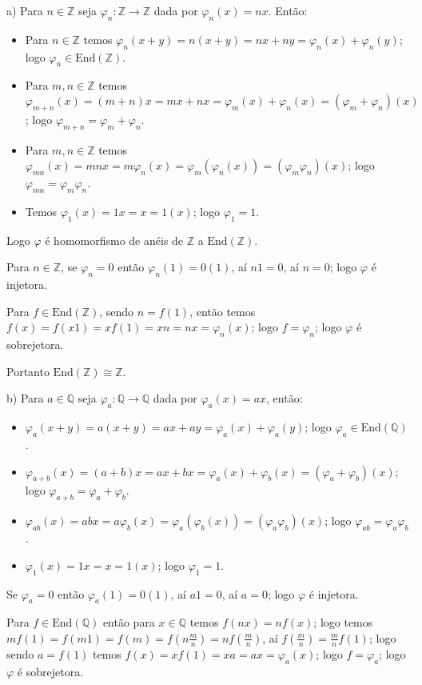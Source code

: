 \documentclass[10pt,a4paper]{article}
\begin{document}
a) Para $n\in\mathbb{Z}$ seja $\varphi_n:\mathbb{Z}\rightarrow\mathbb{Z}$ dada por $\varphi_n(x)=nx$. Então:
\begin{itemize}
\item Para $n\in\mathbb{Z}$ temos $\varphi_n(x+y)=n(x+y)=nx+ny=\varphi_n(x)+\varphi_n(y)$; logo $\varphi_n\in\mathrm{End}(\mathbb{Z})$.
\item Para $m,n\in\mathbb{Z}$ temos $\varphi_{m+n}(x)=(m+n)x=mx+nx=\varphi_m(x)+\varphi_n(x)=(\varphi_m+\varphi_n)(x)$; logo $\varphi_{m+n}=\varphi_m+\varphi_n$.
\item Para $m,n\in\mathbb{Z}$ temos $\varphi_{mn}(x)=mnx=m\varphi_n(x)=\varphi_m(\varphi_n(x))=(\varphi_m\varphi_n)(x)$; logo $\varphi_{mn}=\varphi_m\varphi_n$.
\item Temos $\varphi_1(x)=1x=x=1(x)$; logo $\varphi_1=1$.
\end{itemize}
Logo $\varphi$ é homomorfismo de anéis de $\mathbb{Z}$ a $\mathrm{End}(\mathbb{Z})$.

\medskip
\noindent
Para $n\in\mathbb{Z}$, se $\varphi_n=0$ então $\varphi_n(1)=0(1)$, aí $n1=0$, aí $n=0$; logo $\varphi$ é injetora.

\medskip
\noindent
Para $f\in\mathrm{End}(\mathbb{Z})$, sendo $n=f(1)$, então temos $f(x)=f(x1)=xf(1)=xn=nx=\varphi_n(x)$; logo $f=\varphi_n$; logo $\varphi$ é sobrejetora.

\medskip
\noindent
Portanto $\mathrm{End}(\mathbb{Z})\cong\mathbb{Z}$.

\medskip
\noindent
b) Para $a\in\mathbb{Q}$ seja $\varphi_a:\mathbb{Q}\rightarrow\mathbb{Q}$ dada por $\varphi_a(x)=ax$, então:
\begin{itemize}
\item $\varphi_a(x+y)=a(x+y)=ax+ay=\varphi_a(x)+\varphi_a(y)$; logo $\varphi_a\in\mathrm{End}(\mathbb{Q})$.
\item $\varphi_{a+b}(x)=(a+b)x=ax+bx=\varphi_a(x)+\varphi_b(x)=(\varphi_a+\varphi_b)(x)$; logo $\varphi_{a+b}=\varphi_a+\varphi_b$.
\item $\varphi_{ab}(x)=abx=a\varphi_b(x)=\varphi_a(\varphi_b(x))=(\varphi_a\varphi_b)(x)$; logo $\varphi_{ab}=\varphi_a\varphi_b$.
\item $\varphi_1(x)=1x=x=1(x)$; logo $\varphi_1=1$.
\end{itemize}

\medskip
\noindent
Se $\varphi_a=0$ então $\varphi_a(1)=0(1)$, aí $a1=0$, aí $a=0$; logo $\varphi$ é injetora.

\medskip
\noindent
Para $f\in\mathrm{End}(\mathbb{Q})$ então para $x\in\mathbb{Q}$ temos $f(nx)=nf(x)$; logo temos $mf(1)=f(m1)=f(m)=f(n\frac{m}{n})=nf(\frac{m}{n})$, aí $f(\frac{m}{n})=\frac{m}{n}f(1)$; logo sendo $a=f(1)$ temos $f(x)=xf(1)=xa=ax=\varphi_a(x)$; logo $f=\varphi_a$; logo $\varphi$ é sobrejetora.
\end{document}
